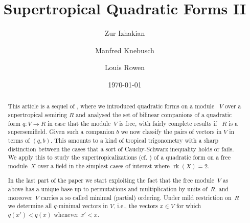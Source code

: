 \documentclass [12pt,a4paper,reqno]{amsart}
\begin{document}
\title[Supertropical  Quadratic Forms II]
{Supertropical  Quadratic Forms II}
\author[Z. Izhakian]{Zur Izhakian}
\address{Institute  of Mathematics,
 University of Aberdeen, AB24 3UE,
Aberdeen,  UK.}

\author[M. Knebusch]{Manfred Knebusch}
\address{Department of Mathematics,
NWF-I Mathematik, Universit\"at Regensburg 93040 Regensburg,
Germany} 
\author[L. Rowen]{Louis Rowen}
 \address{Department of Mathematics,
 Bar-Ilan University,  Ramat-Gan 52900, Israel}


\date{\today}


\begin{abstract} This article is a sequel of \cite{QF1}, where we introduced quadratic forms on a module~ $V$ over a supertropical semiring $R$ and analysed the set of bilinear companions of   a quadratic form $q: V \to R$ in case that the module~$V$ is free, with fairly complete results if~ $R$ is a supersemifield. Given such a companion $b$ we now classify the pairs of vectors in $V$ in terms of $(q,b).$ This amounts to a kind of tropical trigonometry with a sharp distinction between the cases that a sort of Cauchy-Schwarz
inequality holds or fails. We apply this to study the supertropicalizations (cf.  \cite{QF1})  of a quadratic form on a free module~$X$ over a field in the simplest cases of interest where ${\operatorname{rk}}(X) = 2$.

In the last part of the paper we start exploiting  the fact that the free module~$V$ as  above has a unique base up to permutations and multiplication by units of~$R$, and moreover~$V$ carries a so called minimal (partial) ordering. Under mild restriction on~$R$ we determine all $q$-minimal vectors in $V$, i.e., the vectors $x \in V$ for which  $q(x') < q(x)$ whenever $x' < x.$
\end{abstract}

\maketitle

{\small \tableofcontents}
\end{document}
